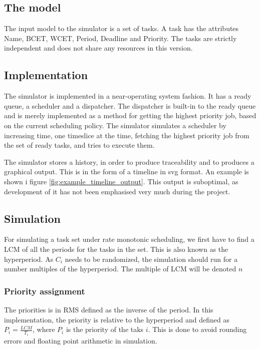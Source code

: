 \documentclass{acm_proc_article-sp}
\begin{document}
\subsection{The model}
The input model to the simulator is a set of tasks. A task has the attributes Name, BCET, WCET, Period, Deadline and Priority. The tasks are strictly independent and does not share any resources in this version.

\subsection{Implementation}
The simulator is implemented in a near-operating system fashion. It has a ready queue, a scheduler and a dispatcher. The dispatcher is built-in to the ready queue and is merely implemented as a method for getting the highest priority job, based on the current scheduling policy. The simulator simulates a scheduler by increasing time, one timeslice at the time, fetching the highest priority job from the set of ready tasks, and tries to execute them.

The simulator stores a history, in order to produce traceability and to produces a graphical output.
This is in the form of a timeline in svg format. An example is shown i figure \ref{fig:example_timeline_output}. This output is suboptimal, as development of it has not been emphasised very much during the project.

\subsection{Simulation}
For simulating a task set under rate monotonic scheduling, we first have to find a LCM of all the periods for the tasks in the set. This is also known as the hyperperiod. As $C_i$ needs to be randomized, the simulation should run for a number multiples of the hyperperiod. The multiple of LCM will be denoted $n$
\subsubsection*{Priority assignment}
The priorities is in RMS defined as the inverse of the period. In this implementation, the priority is relative to the hyperperiod and defined as $P_i = \frac{LCM}{T_i}$, where $P_i$ is the priority of the taks $i$. This is done to avoid rounding errors and floating point arithmetic in simulation.
\end{document}
